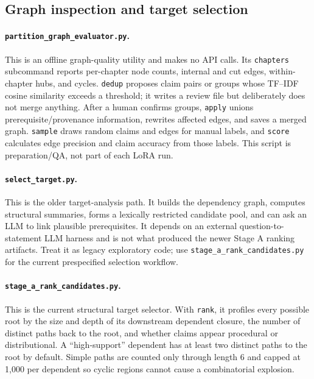 \documentclass[11pt]{article}
\begin{document}
\subsection{Graph inspection and target selection}

\paragraph{\texttt{partition\_graph\_evaluator.py}.}
This is an offline graph-quality utility and makes no API calls.  Its
\texttt{chapters} subcommand reports per-chapter node counts, internal and cut
edges, within-chapter hubs, and cycles.  \texttt{dedup} proposes claim pairs or
groups whose TF--IDF cosine similarity exceeds a threshold; it writes a review
file but deliberately does not merge anything.  After a human confirms groups,
\texttt{apply} unions prerequisite/provenance information, rewrites affected
edges, and saves a merged graph.  \texttt{sample} draws random claims and edges
for manual labels, and \texttt{score} calculates edge precision and claim
accuracy from those labels.  This script is preparation/QA, not part of each
LoRA run.

\paragraph{\texttt{select\_target.py}.}
This is the older target-analysis path.  It builds the dependency graph,
computes structural summaries, forms a lexically restricted candidate pool, and
can ask an LLM to link plausible prerequisites.  It depends on an external
question-to-statement LLM harness and is not what produced the newer Stage A
ranking artifacts.  Treat it as legacy exploratory code; use
\texttt{stage\_a\_rank\_candidates.py} for the current prespecified selection
workflow.

\paragraph{\texttt{stage\_a\_rank\_candidates.py}.}
This is the current structural target selector.  With \texttt{rank}, it profiles
every possible root by the size and depth of its downstream dependent closure,
the number of distinct paths back to the root, and whether claims appear
procedural or distributional.  A ``high-support'' dependent has at least two
distinct paths to the root by default.  Simple paths are counted only through
length 6 and capped at 1,000 per dependent so cyclic regions cannot cause a
combinatorial explosion.
\end{document}
